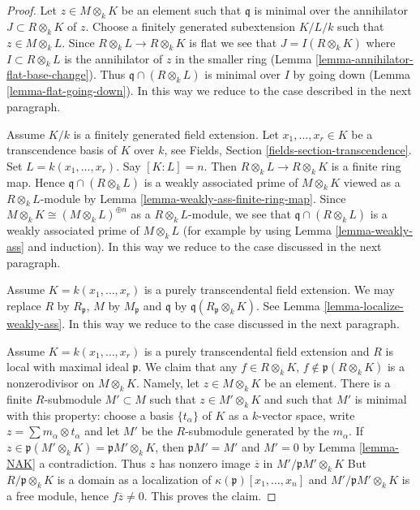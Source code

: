 \begin{proof}
Let $z \in M \otimes_k K$ be an element such that $\mathfrak q$
is minimal over the annihilator $J \subset R \otimes_k K$ of $z$.
Choose a finitely generated subextension $K/L/k$ such that
$z \in M \otimes_k L$. Since $R \otimes_k L \to R \otimes_k K$
is flat we see that $J = I(R \otimes_k K)$ where $I \subset R \otimes_k L$
is the annihilator of $z$ in the smaller ring
(Lemma \ref{lemma-annihilator-flat-base-change}).
Thus $\mathfrak q \cap (R \otimes_k L)$ is minimal over $I$ by
going down (Lemma \ref{lemma-flat-going-down}).
In this way we reduce to the case described in the next paragraph.

\medskip\noindent
Assume $K/k$ is a finitely generated field extension.
Let $x_1, \ldots, x_r \in K$ be a transcendence basis
of $K$ over $k$, see Fields, Section \ref{fields-section-transcendence}.
Set $L = k(x_1, \ldots, x_r)$. Say $[K : L] = n$. Then
$R \otimes_k L \to R \otimes_k K$ is a finite ring map.
Hence $\mathfrak q \cap (R \otimes_k L)$
is a weakly associated prime of $M \otimes_k K$
viewed as a $R \otimes_k L$-module by
Lemma \ref{lemma-weakly-ass-finite-ring-map}.
Since $M \otimes_k K \cong (M \otimes_k L)^{\oplus n}$
as a $R \otimes_k L$-module, we see that
$\mathfrak q \cap (R \otimes_k L)$
is a weakly associated prime of $M \otimes_k L$
(for example by using Lemma \ref{lemma-weakly-ass} and induction).
In this way we reduce to the case discussed in the next paragraph.

\medskip\noindent
Assume $K = k(x_1, \ldots, x_r)$ is a purely transcendental field extension.
We may replace $R$ by $R_\mathfrak p$, $M$ by $M_\mathfrak p$
and $\mathfrak q$ by $\mathfrak q(R_\mathfrak p \otimes_k K)$.
See Lemma \ref{lemma-localize-weakly-ass}.
In this way we reduce to the case discussed in the next paragraph.

\medskip\noindent
Assume $K = k(x_1, \ldots, x_r)$ is a purely transcendental field extension
and $R$ is local with maximal ideal $\mathfrak p$. We claim that any
$f \in R \otimes_k K$, $f \not \in \mathfrak p(R \otimes_k K)$
is a nonzerodivisor on $M \otimes_k K$. Namely, let
$z \in M \otimes_k K$ be an element.
There is a finite $R$-submodule $M' \subset M$ such that
$z \in M' \otimes_k K$ and such that $M'$ is minimal with
this property: choose a basis $\{t_\alpha\}$ of $K$ as a
$k$-vector space, write $z = \sum m_\alpha \otimes t_\alpha$ and let
$M'$ be the $R$-submodule generated by the $m_\alpha$.
If $z \in \mathfrak p(M' \otimes_k K) = \mathfrak p M' \otimes_k K$,
then $\mathfrak pM' = M'$ and $M' = 0$ by Lemma \ref{lemma-NAK}
a contradiction.
Thus $z$ has nonzero image $\overline{z}$ in $M'/\mathfrak p M' \otimes_k K$
But $R/\mathfrak p \otimes_k K$ is a domain as a localization
of $\kappa(\mathfrak p)[x_1, \ldots, x_n]$ and
$M'/\mathfrak p M' \otimes_k K$ is a free module, hence
$f\overline{z} \not = 0$. This proves the claim.


\end{proof}
